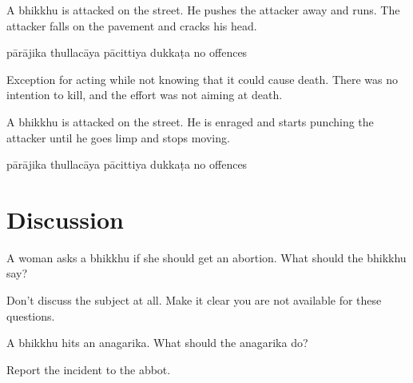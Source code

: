 \begin{exam}{\autoExamName}
\begin{problem*}
\begin{parts}
  \item A bhikkhu is attacked on the street. He pushes the attacker away and runs. The
  attacker falls on the pavement and cracks his head.

  \bigskip

  \begin{answers}{5}
    \bChoices
     pārājika\eAns
     thullacāya\eAns
     pācittiya\eAns
     dukkaṭa\eAns
     no offences\eAns
    \eChoices
  \end{answers}

  \begin{solution}
    Exception for acting while not knowing that it could cause death. There was
    no intention to kill, and the effort was not aiming at death.
  \end{solution}

  \bigskip

  \item A bhikkhu is attacked on the street. He is enraged and starts punching the attacker
  until he goes limp and stops moving.

  \bigskip

  \begin{answers}{5}
    \bChoices
     pārājika\eAns
     thullacāya\eAns
     pācittiya\eAns
     dukkaṭa\eAns
     no offences\eAns
    \eChoices
  \end{answers}

\end{parts}

\end{problem*}

\section*{Discussion}

A woman asks a bhikkhu if she should get an abortion. What should the bhikkhu say?

\begin{solution}
  Don't discuss the subject at all. Make it clear you are not available for these questions.
\end{solution}

\bigskip

A bhikkhu hits an anagarika. What should the anagarika do?

\begin{solution}
  Report the incident to the abbot.
\end{solution}


\end{exam}
